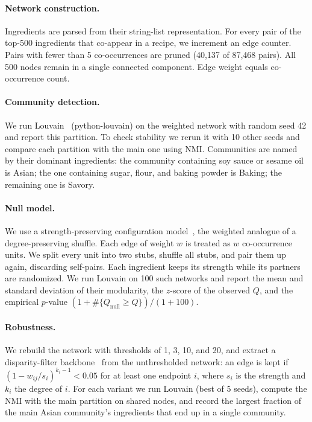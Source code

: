\documentclass[9pt,twocolumn]{pnas-new}
\begin{document}
\paragraph{Network construction.}
Ingredients are parsed from their string-list representation. For every pair of the top-500 ingredients that co-appear in a recipe, we increment an edge counter. Pairs with fewer than 5 co-occurrences are pruned (40,137 of 87,468 pairs). All 500 nodes remain in a single connected component. Edge weight equals co-occurrence count.

\paragraph{Community detection.}
We run Louvain~\cite{blondel2008fast} (python-louvain) on the weighted network with random seed 42 and report this partition. To check stability we rerun it with 10 other seeds and compare each partition with the main one using NMI. Communities are named by their dominant ingredients: the community containing soy sauce or sesame oil is Asian; the one containing sugar, flour, and baking powder is Baking; the remaining one is Savory.

\paragraph{Null model.}
We use a strength-preserving configuration model~\cite{maslov2002specificity,newman2004finding}, the weighted analogue of a degree-preserving shuffle. Each edge of weight $w$ is treated as $w$ co-occurrence units. We split every unit into two stubs, shuffle all stubs, and pair them up again, discarding self-pairs. Each ingredient keeps its strength while its partners are randomized. We run Louvain on 100 such networks and report the mean and standard deviation of their modularity, the $z$-score of the observed $Q$, and the empirical $p$-value $(1 + \#\{Q_\mathrm{null} \ge Q\})/(1 + 100)$.

\paragraph{Robustness.}
We rebuild the network with thresholds of 1, 3, 10, and 20, and extract a disparity-filter backbone~\cite{serrano2009extracting} from the unthresholded network: an edge is kept if $(1 - w_{ij}/s_i)^{k_i - 1} < 0.05$ for at least one endpoint $i$, where $s_i$ is the strength and $k_i$ the degree of $i$. For each variant we run Louvain (best of 5 seeds), compute the NMI with the main partition on shared nodes, and record the largest fraction of the main Asian community's ingredients that end up in a single community.
\end{document}
